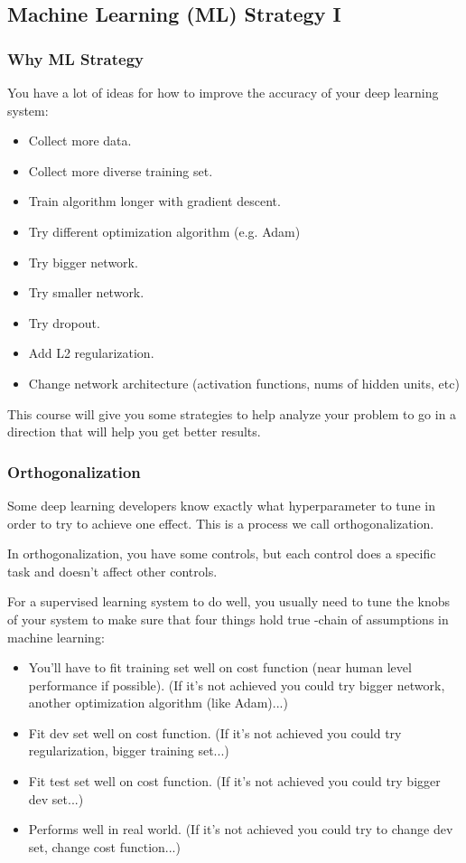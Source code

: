 \subsection{Machine Learning (ML) Strategy I}
\subsubsection{Why ML Strategy}
You have a lot of ideas for how to improve the accuracy of your deep learning system:

\begin{itemize}
    \item Collect more data.
    \item Collect more diverse training set.
    \item Train algorithm longer with gradient descent.
    \item Try different optimization algorithm (e.g. Adam)
    \item Try bigger network.
    \item Try smaller network.
    \item Try dropout.
    \item Add L2 regularization.
    \item Change network architecture (activation functions, nums of hidden units, etc)
\end{itemize}

This course will give you some strategies to help analyze your problem to go in a direction that will help you get better results.

\subsubsection{Orthogonalization}
Some deep learning developers know exactly what hyperparameter to tune in order to try to achieve one effect. This is a process we call orthogonalization.

In orthogonalization, you have some controls, but each control does a specific task and doesn't affect other controls.

For a supervised learning system to do well, you usually need to tune the knobs of your system to make sure that four things hold true -chain of assumptions in machine learning:

\begin{itemize}
    \item You'll have to fit training set well on cost function (near human level performance if possible). (If it's not achieved you could try bigger network, another optimization algorithm (like Adam)...)
    \item Fit dev set well on cost function. (If it's not achieved you could try regularization, bigger training set...)
    \item Fit test set well on cost function. (If it's not achieved you could try bigger dev set...)
    \item Performs well in real world. (If it's not achieved you could try to change dev set, change cost function...)
\end{itemize}

